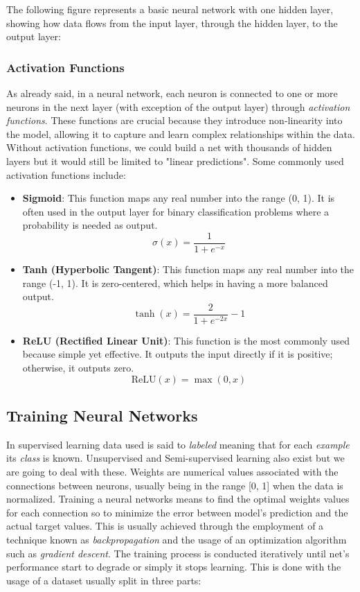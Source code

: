 \documentclass[../Thesis.tex]{subfiles}
\begin{document}
	The following figure represents a basic neural network with one hidden layer, showing how data flows from the input layer, through the hidden layer, to the output layer:
	
	
	\subsubsection{Activation Functions}

	As already said, in a neural network, each neuron is connected to one or more neurons in the next layer (with exception of the output layer) through \emph{activation functions}. These functions are crucial because they introduce non-linearity into the model, allowing it to capture and learn complex relationships within the data. Without activation functions, we could build a net with thousands of hidden layers but it would still be limited to "linear predictions". Some commonly used activation functions include:
	
	\begin{itemize}
		\item \textbf{Sigmoid}: This function maps any real number into the range (0, 1). It is often used in the output layer for binary classification problems where a probability is needed as output.
		\[
		\sigma(x) = \frac{1}{1 + e^{-x}}
		\]
		\item \textbf{Tanh (Hyperbolic Tangent)}: This function maps any real number into the range (-1, 1). It is zero-centered, which helps in having a more balanced output.
		\[
		\tanh(x) = \frac{2}{1 + e^{-2x}} - 1
		\]
		\item \textbf{ReLU (Rectified Linear Unit)}: This function is the most commonly used because simple yet effective. It outputs the input directly if it is positive; otherwise, it outputs zero.
		\[
		\text{ReLU}(x) = \max(0, x)
		\]
	\end{itemize}
	
\subsection{Training Neural Networks}

In supervised learning data used is said to \emph{labeled} meaning that for each \emph{example} its \emph{class} is known. Unsupervised and Semi-supervised learning also exist but we are going to deal with these. Weights are numerical values associated with the connections between neurons, usually being in the range [0, 1] when the data is normalized. Training a neural networks means to find the optimal weights values for each connection so to minimize the error between model's prediction and the actual target values. This is usually achieved through the employment of a technique known as \emph{backpropagation} and the usage of an optimization algorithm such as \emph{gradient descent}. The training process is conducted iteratively until net's performance start to degrade or simply it stops learning. This is done with the usage of a dataset usually split in three parts:
\end{document}

